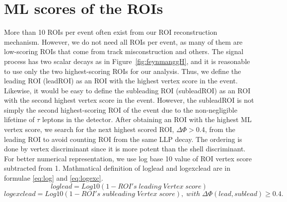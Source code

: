 \section{ML scores of the ROIs}
More than 10 ROIs per event often exist from our ROI reconstruction mechanism.
However, we do not need all ROIs per event, as many of them are low-scoring ROIs that come from track misconstruction and others.
The signal process has two scalar decays as in Figure~\ref{fig:feynmanggH}, and it is reasonable to use only the two highest-scoring ROIs for our analysis.
Thus, we define the leading ROI (leadROI) as an ROI with the highest vertex score in the event.
Likewise, it would be easy to define the subleading ROI (subleadROI) as an ROI with the second highest vertex score in the event.
However, the subleadROI is not simply the second highest-scoring ROI of the event due to the non-negligible lifetime of $\tau$ leptons in the detector.
After obtaining an ROI with the highest ML vertex score, we search for the next highest scored ROI, $\Delta\Phi>$0.4, from the leading ROI to avoid counting ROI from the same LLP decay.
The ordering is done by vertex discriminant since it is more potent than the shell discriminant.
For better numerical representation, we use log base 10 value of ROI vertex score subtracted from 1.
Mathmatical definition of loglead and logexclead are in formulae \ref{eq:log} and \ref{eq:logexc}. 
\begin{equation}
\label{eq:log}
	loglead = Log10(1-ROI's\;leading\;Vertex\;score)
\end{equation}
\begin{equation}
\label{eq:logexc}
	logexclead = Log10(1-ROI's\;subleading\;Vertex\;score),\;with\;\Delta\Phi(lead,sublead) \geq 0.4.
\end{equation}

%


